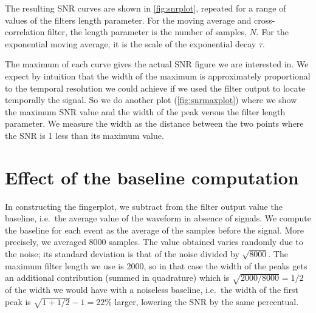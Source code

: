 The resulting SNR curves are shown in \autoref{fig:snrplot}, repeated for a
range of values of the filters length parameter. For the moving average and
cross-correlation filter, the length parameter is the number of samples, $N$.
For the exponential moving average, it is the scale of the exponential decay
$\tau$.

\begin{figure}
    

\end{figure}

The maximum of each curve gives the actual SNR figure we are interested in. We
expect by intuition that the width of the maximum is approximately proportional
to the temporal resolution we could achieve if we used the filter output to
locate temporally the signal. So we do another plot
(\autoref{fig:snrmaxplot}) where we show the maximum SNR value and the width
of the peak versus the filter length parameter. We measure the width as the
distance between the two points where the SNR is 1 less than its maximum value.


\begin{figure}
    

\end{figure}

\section{Effect of the baseline computation}

In constructing the fingerplot, we subtract from the filter output value the
baseline, i.e.\ the average value of the waveform in absence of signals. We
compute the baseline for each event as the average of the samples before the
signal. More precisely, we averaged \num{8000} samples. The value obtained
varies randomly due to the noise; its standard deviation is that of the noise
divided by $\sqrt{8000}$. The maximum filter length we use is 2000, so in that
case the width of the peaks gets an additional contribution (summed in
quadrature) which is $\sqrt{2000/8000} = 1/2$ of the width we would have with a
noiseless baseline, i.e.\ the width of the first peak is $\sqrt{1 + 1/2} - 1 =
\SI{22}\%$ larger, lowering the SNR by the same percentual.

